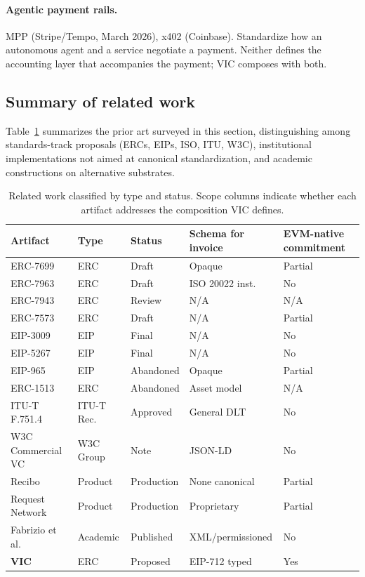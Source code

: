 \documentclass[11pt,a4paper]{article}
\begin{document}
\paragraph{Agentic payment rails.} MPP (Stripe/Tempo, March 2026), x402 (Coinbase). Standardize how an autonomous agent and a service negotiate a payment. Neither defines the accounting layer that accompanies the payment; VIC composes with both.

\subsection{Summary of related work}

Table~\ref{tab:related} summarizes the prior art surveyed in this section, distinguishing among standards-track proposals (ERCs, EIPs, ISO, ITU, W3C), institutional implementations not aimed at canonical standardization, and academic constructions on alternative substrates.

\begin{table}[h]
\centering
\caption{Related work classified by type and status. Scope columns indicate whether each artifact addresses the composition VIC defines.}
\label{tab:related}
\small
\begin{tabular}{lllll}
\toprule
Artifact & Type & Status & Schema for invoice & EVM-native commitment \\
\midrule
ERC-7699          & ERC          & Draft        & Opaque         & Partial \\
ERC-7963          & ERC          & Draft        & ISO 20022 inst. & No \\
ERC-7943          & ERC          & Review       & N/A            & N/A \\
ERC-7573          & ERC          & Draft        & N/A            & Partial \\
EIP-3009          & EIP          & Final        & N/A            & No \\
EIP-5267          & EIP          & Final        & N/A            & No \\
EIP-965           & EIP          & Abandoned    & Opaque         & Partial \\
ERC-1513          & ERC          & Abandoned    & Asset model    & N/A \\
ITU-T F.751.4     & ITU-T Rec.   & Approved     & General DLT    & No \\
W3C Commercial VC & W3C Group    & Note         & JSON-LD        & No \\
Recibo            & Product      & Production   & None canonical & Partial \\
Request Network   & Product      & Production   & Proprietary    & Partial \\
Fabrizio et al.   & Academic     & Published    & XML/permissioned & No \\
\textbf{VIC}      & ERC          & Proposed     & EIP-712 typed  & Yes \\
\bottomrule
\end{tabular}
\end{table}
\end{document}
